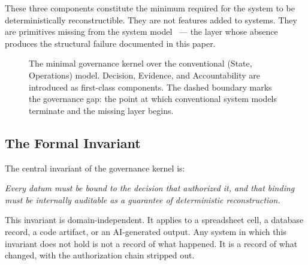 \documentclass[conference]{IEEEtran}
\begin{document}
These three components constitute the minimum required for the system to be deterministically reconstructible. They are not features added to systems. They are primitives missing from the system model~\cite{kooi2003} --- the layer whose absence produces the structural failure documented in this paper.

\begin{figure}[t]
\centering
{}
\caption{The minimal governance kernel over the conventional (State, Operations) model. Decision, Evidence, and Accountability are introduced as first-class components. The dashed boundary marks the governance gap: the point at which conventional system models terminate and the missing layer begins.}
\label{fig:kernel}
\end{figure}

\subsection{The Formal Invariant}

The central invariant of the governance kernel is:

\medskip
\noindent\emph{Every datum must be bound to the decision that authorized it, and that binding must be internally auditable as a guarantee of deterministic reconstruction.}

\medskip
This invariant is domain-independent. It applies to a spreadsheet cell, a database record, a code artifact, or an AI-generated output. Any system in which this invariant does not hold is not a record of what happened. It is a record of what changed, with the authorization chain stripped out.
\end{document}

